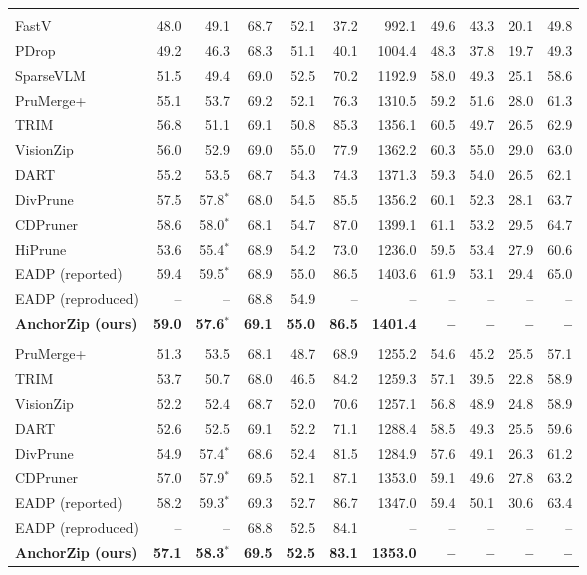 \documentclass[10pt,a4paper]{article}
\begin{document}
{\begin{tabular}{lrrrrrrrrrr}
\rowcolor{black!12}\multicolumn{11}{c}{\textit{Retain 64 tokens}} \\
FastV & 48.0 & 49.1 & 68.7 & 52.1 & 37.2 & 992.1 & 49.6 & 43.3 & 20.1 & 49.8 \\
PDrop & 49.2 & 46.3 & 68.3 & 51.1 & 40.1 & 1004.4 & 48.3 & 37.8 & 19.7 & 49.3 \\
SparseVLM & 51.5 & 49.4 & 69.0 & 52.5 & 70.2 & 1192.9 & 58.0 & 49.3 & 25.1 & 58.6 \\
PruMerge+ & 55.1 & 53.7 & 69.2 & 52.1 & 76.3 & 1310.5 & 59.2 & 51.6 & 28.0 & 61.3 \\
TRIM & 56.8 & 51.1 & 69.1 & 50.8 & 85.3 & 1356.1 & 60.5 & 49.7 & 26.5 & 62.9 \\
VisionZip & 56.0 & 52.9 & 69.0 & 55.0 & 77.9 & 1362.2 & 60.3 & 55.0 & 29.0 & 63.0 \\
DART & 55.2 & 53.5 & 68.7 & 54.3 & 74.3 & 1371.3 & 59.3 & 54.0 & 26.5 & 62.1 \\
DivPrune & 57.5 & 57.8$^{*}$ & 68.0 & 54.5 & 85.5 & 1356.2 & 60.1 & 52.3 & 28.1 & 63.7 \\
CDPruner & 58.6 & 58.0$^{*}$ & 68.1 & 54.7 & 87.0 & 1399.1 & 61.1 & 53.2 & 29.5 & 64.7 \\
HiPrune & 53.6 & 55.4$^{*}$ & 68.9 & 54.2 & 73.0 & 1236.0 & 59.5 & 53.4 & 27.9 & 60.6 \\
EADP (reported) & 59.4 & 59.5$^{*}$ & 68.9 & 55.0 & 86.5 & 1403.6 & 61.9 & 53.1 & 29.4 & 65.0 \\
EADP (reproduced) & -- & -- & 68.8 & 54.9 & -- & -- & -- & -- & -- & -- \\
\textbf{AnchorZip (ours)} & \textbf{59.0} & \textbf{57.6$^{*}$} & \textbf{69.1} & \textbf{55.0} & \textbf{86.5} & \textbf{1401.4} & \textbf{--} & \textbf{--} & \textbf{--} & \textbf{--} \\
\rowcolor{black!12}\multicolumn{11}{c}{\textit{Retain 32 tokens}} \\
PruMerge+ & 51.3 & 53.5 & 68.1 & 48.7 & 68.9 & 1255.2 & 54.6 & 45.2 & 25.5 & 57.1 \\
TRIM & 53.7 & 50.7 & 68.0 & 46.5 & 84.2 & 1259.3 & 57.1 & 39.5 & 22.8 & 58.9 \\
VisionZip & 52.2 & 52.4 & 68.7 & 52.0 & 70.6 & 1257.1 & 56.8 & 48.9 & 24.8 & 58.9 \\
DART & 52.6 & 52.5 & 69.1 & 52.2 & 71.1 & 1288.4 & 58.5 & 49.3 & 25.5 & 59.6 \\
DivPrune & 54.9 & 57.4$^{*}$ & 68.6 & 52.4 & 81.5 & 1284.9 & 57.6 & 49.1 & 26.3 & 61.2 \\
CDPruner & 57.0 & 57.9$^{*}$ & 69.5 & 52.1 & 87.1 & 1353.0 & 59.1 & 49.6 & 27.8 & 63.2 \\
EADP (reported) & 58.2 & 59.3$^{*}$ & 69.3 & 52.7 & 86.7 & 1347.0 & 59.4 & 50.1 & 30.6 & 63.4 \\
EADP (reproduced) & -- & -- & 68.8 & 52.5 & 84.1 & -- & -- & -- & -- & -- \\
\textbf{AnchorZip (ours)} & \textbf{57.1} & \textbf{58.3$^{*}$} & \textbf{69.5} & \textbf{52.5} & \textbf{83.1} & \textbf{1353.0} & \textbf{--} & \textbf{--} & \textbf{--} & \textbf{--} \\
\bottomrule\end{tabular}}\endgroup\par\medskip
\end{document}

